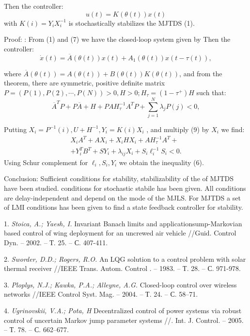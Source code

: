 Then the controller:
\begin{equation}
u(t)=K(\theta(t))x(t)
\end{equation}
with $K(i)=Y_i X_i^{-1}$ is stochastically stabilizes the MJTDS (1).

Proof: : From (1) and (7) we have the closed-loop system given by
Then the controller:
\begin{equation}
\dot{x}(t)=\overline A(\theta(t))x(t) +A_1(\theta(t))x(t-\tau(t)),
\end{equation}

where $\overline A(\theta(t))=A(\theta(t))+B(\theta(t))K(\theta(t))$, and from the theorem, there are symmetric, positive definite matrix $P=(P(1),P(2),\cdots,P(N))>0 ,H>0; H_\tau =(1-\tau^+)H$ such that:
\begin{equation}
\overline A^TP +P\overline A+H+ PAH_\tau^{-1}A^TP+\sum_{j=1}^{N}\lambda_j P(j)<0,
\end{equation}

Putting $X_i=P^{-1}(i), U+H^{-1}, Y_i=K(i)X_i$ , and multiply (9) by $X_i$ we find:
\begin{multline}
X_iA^T+AX_i+X_iHX_i+AH_\tau ^{-1} A^T+
\\+
Y_i^TB^T+SY_i+\lambda_{ij}X_i+S_i\ell_i^{-1}S_i<0
.
\end{multline}
Using Schur complement for $\ell_i , S_i , Y_i$ we obtain the inequality (6).

Conclusion:
 Sufficient conditions for stability, stabilizability of the of MJTDS have been studied. conditions for stochastic stabile has been given. All conditions are delay-independent and depend on the mode of the MJLS. For MJTDS a set of LMI conditions has been given to find a state feedback controller for stability.

\litlist

1. {\it Stoica, A.; Yaesh, I. }
 Invariant Banach limits and applicationsump-Markovian based control of wing deployment for an uncrewed air vehicle //Guid. Control Dyn. – 2002. – Т. 25. – С. 407-411.

2. {\it Sworder, D.D.; Rogers, R.O. }
 An LQG solution to a control problem with solar thermal receiver //IEEE Trans. Autom. Control . – 1983. – Т. 28. – С. 971-978.

3. {\it Ploplys, N.J.; Kawka, P.A.; Alleyne, A.G. }
 Closed-loop control over wireless networks //IEEE Control Syst. Mag. – 2004. – Т. 24. – С. 58–71.

4. {\it Ugrinovskii, V.A.; Pota, H }
 Decentralized control of power systems via robust control of uncertain Markov jump parameter systems //. Int. J. Control. – 2005. – Т. 78. – С. 662–677.

